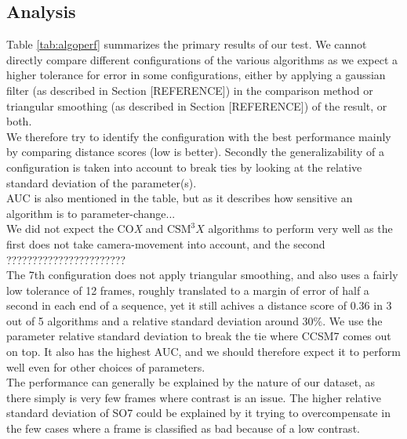 \subsection{Analysis}
%
Table \ref{tab:algoperf} summarizes the primary results of our test. We cannot directly compare different configurations of the various algorithms as we expect a higher tolerance for error in some configurations, either by applying a gaussian filter (as described in Section [REFERENCE]) in the comparison method or triangular smoothing (as described in Section [REFERENCE]) of the result, or both.\\
We therefore try to identify the configuration with the best performance mainly by comparing distance scores (low is better). Secondly the generalizability of a configuration is taken into account to break ties by looking at the relative standard deviation of the parameter(s).\\
AUC is also mentioned in the table, but as it describes how sensitive an algorithm is to parameter-change...\\
We did not expect the CO\textit{X} and $\text{CSM}^{3}\textit{X}$ algorithms to perform very well as the first does not take camera-movement into account, and the second ???????????????????????\\
The 7th configuration does not apply triangular smoothing, and also uses a fairly low tolerance of 12 frames, roughly translated to a margin of error of half a second in each end of a sequence, yet it still achives a distance score of $0.36$ in 3 out of 5 algorithms and a relative standard deviation around $30\%$. We use the parameter relative standard deviation to break the tie where CCSM7 comes out on top. It also has the highest AUC, and we should therefore expect it to perform well even for other choices of parameters.\\
The performance can generally be explained by the nature of our dataset, as there simply is very few frames where contrast is an issue. The higher relative standard deviation of SO7 could be explained by it trying to overcompensate in the few cases where a frame is classified as bad because of a low contrast.
%
